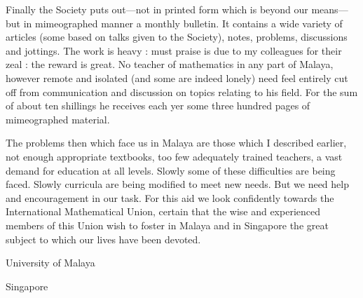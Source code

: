 \smallskip
Finally the Society puts out---not in printed form which is beyond our means---but in mimeographed manner a monthly bulletin. It contains a wide variety of articles (some based on talks given to the Society), notes, problems, discussions and jottings. The work is heavy : must praise is due to my colleagues for their zeal : the reward is great. No teacher of mathematics in any part of Malaya, however remote and isolated (and some are indeed lonely) need feel entirely cut off from communication and discussion on topics relating to his field. For the sum of about ten shillings he receives each yer some three hundred pages of mimeographed material.

\smallskip
The problems then which face us in Malaya are those which I described earlier, not enough appropriate textbooks, too few adequately trained teachers, a vast demand for education at all levels. Slowly some of these difficulties are being faced. Slowly curricula are being modified to meet new needs. But we need help and encouragement in our task. For this aid we look confidently towards the International Mathematical Union, certain that the wise and experienced members of this Union wish to foster in Malaya and in Singapore the great subject to which our lives have been devoted.

\bigskip
\medskip

{\fontsize{9pt}{11pt}\selectfont
University of Malaya

Singapore
}\relax

